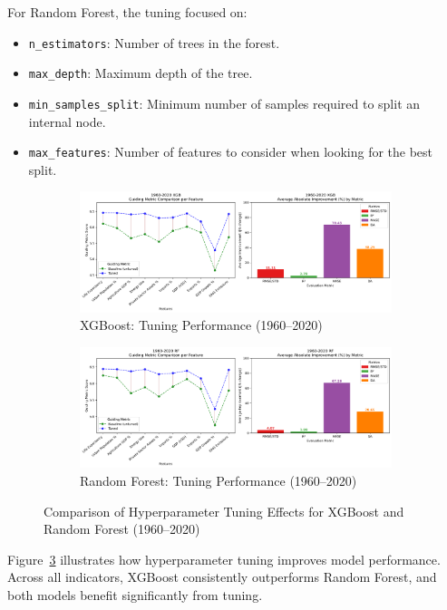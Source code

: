 \documentclass[12pt]{article}
\begin{document}
For Random Forest, the tuning focused on:
\begin{itemize}
    \item \texttt{n\_estimators}: Number of trees in the forest.
    \item \texttt{max\_depth}: Maximum depth of the tree.
    \item \texttt{min\_samples\_split}: Minimum number of samples required to split an internal node.
    \item \texttt{max\_features}: Number of features to consider when looking for the best split.
\end{itemize}
\begin{figure}[H]
    \centering
    \begin{subfigure}[t]{0.9\textwidth}
        \centering
        \includegraphics[width=\linewidth]{1960_2020_XGB_tuning_metrics.png}
        \caption{XGBoost: Tuning Performance (1960--2020)}
        \label{fig:xgb_tuning_1960_2020}
    \end{subfigure}
    \vspace{1em}
    \begin{subfigure}[t]{0.9\textwidth}
        \centering
        \includegraphics[width=\linewidth]{1960_2020_RF_tuning_metrics.png}
        \caption{Random Forest: Tuning Performance (1960--2020)}
        \label{fig:rf_tuning_1960_2020}
    \end{subfigure}
    \caption{Comparison of Hyperparameter Tuning Effects for XGBoost and Random Forest (1960--2020)}
    \label{fig:tuning_combined}
\end{figure}
Figure~\ref{fig:tuning_combined} illustrates how hyperparameter tuning improves model performance. Across all indicators, XGBoost consistently outperforms Random Forest, and both models benefit significantly from tuning.
\end{document}
